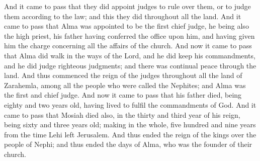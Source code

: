 \bverse \iffalse And it came to pass that they did appoint judges to rule over them, or to judge them according to the law; and this they did throughout all the land. \fi
And it came to pass that they did appoint judges to rule over them, or to judge them according to the law; and this they did throughout all the land.
\bverse \iffalse And it came to pass that Alma was appointed to be the first chief judge, he being also the high priest, his father having conferred the office upon him, and having given him the charge concerning all the affairs of the church. \fi
And it came to pass that Alma was appointed to be the first chief judge, he being also the high priest, his father having conferred the office upon him, and having given him the charge concerning all the affairs of the church.
\bverse \iffalse And now it came to pass that Alma did walk in the ways of the Lord, and he did keep his commandments, and he did judge righteous judgments; and there was continual peace through the land. \fi
And now it came to pass that Alma did walk in the ways of the Lord, and he did keep his commandments, and he did judge righteous judgments; and there was continual peace through the land.
\bverse \iffalse And thus commenced the reign of the judges throughout all the land of Zarahemla, among all the people who were called the Nephites; and Alma was the first and chief judge. \fi
And thus commenced the reign of the judges throughout all the land of Zarahemla, among all the people who were called the Nephites; and Alma was the first and chief judge.
\bverse \iffalse And now it came to pass that his father died, being eighty and two years old, having lived to fulfil the commandments of God. \fi
And now it came to pass that his father died, being eighty and two years old, having lived to fulfil the commandments of God.
\bverse \iffalse And it came to pass that Mosiah died also, in the thirty and third year of his reign, being sixty and three years old; making in the whole, five hundred and nine years from the time Lehi left Jerusalem. \fi
And it came to pass that Mosiah died also, in the thirty and third year of his reign, being sixty and three years old; making in the whole, five hundred and nine years from the time Lehi left Jerusalem.
\bverse \iffalse And thus ended the reign of the kings over the people of Nephi; and thus ended the days of Alma, who was the founder of their church. \fi
And thus ended the reign of the kings over the people of Nephi; and thus ended the days of Alma, who was the founder of their church.


